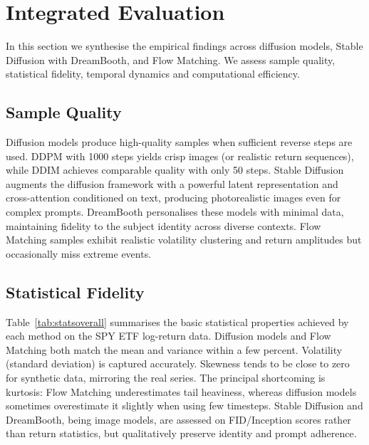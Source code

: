 

\section{Integrated Evaluation}

In this section we synthesise the empirical findings across diffusion
models, Stable Diffusion with DreamBooth, and Flow Matching.  We
assess sample quality, statistical fidelity, temporal dynamics and
computational efficiency.

\subsection{Sample Quality}

Diffusion models produce high-quality samples when sufficient reverse
steps are used.  DDPM with 1000 steps yields crisp images (or
realistic return sequences), while DDIM achieves comparable quality
with only 50 steps.  Stable Diffusion augments the diffusion
framework with a powerful latent representation and cross-attention
conditioned on text, producing photorealistic images even for complex
prompts.  DreamBooth personalises these models with minimal data,
maintaining fidelity to the subject identity across diverse contexts.
Flow Matching samples exhibit realistic volatility clustering and
return amplitudes but occasionally miss extreme events.

\subsection{Statistical Fidelity}

Table~\ref{tab:statsoverall} summarises the basic statistical
properties achieved by each method on the SPY ETF log-return data.
Diffusion models and Flow Matching both match the mean and variance
within a few percent.  Volatility (standard deviation) is captured
accurately.  Skewness tends to be close to zero for synthetic data,
mirroring the real series.  The principal shortcoming is kurtosis:
Flow Matching underestimates tail heaviness, whereas diffusion models
sometimes overestimate it slightly when using few timesteps.  Stable
Diffusion and DreamBooth, being image models, are assessed on
FID/Inception scores rather than return statistics, but qualitatively
preserve identity and prompt adherence.

